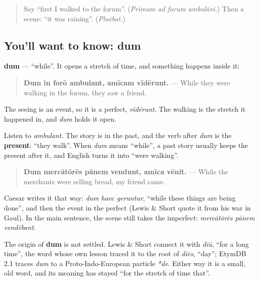 \label{lesson:LA-C282-dum}



\begin{quote}
Say \textquotedblleft{}first I walked to the forum\textquotedblright{}. (\emph{Prīmum ad forum ambulāvī.}) Then a scene: \textquotedblleft{}it was raining\textquotedblright{}. (\emph{Pluēbat.})
\end{quote}

\subsection*{You'll want to know: dum}
\textbf{dum} — \textquotedblleft{}while\textquotedblright{}. It opens a stretch of time, and something happens inside it:

\begin{quote}
\textbf{Dum in forō ambulant, amīcam vīdērunt.} — While they were walking in the forum, they saw a friend.
\end{quote}

The seeing is an event, so it is a perfect, \emph{vīdērunt}. The walking is the stretch it happened in, and \emph{dum} holds it open.

\begin{grammarlens}[title={Grammar Lens: dum keeps the present}]
Listen to \emph{ambulant}. The story is in the past, and the verb after \emph{dum} is the \textbf{present}: \textquotedblleft{}they walk\textquotedblright{}. When \emph{dum} means \textquotedblleft{}while\textquotedblright{}, a past story usually keeps the present after it, and English turns it into \textquotedblleft{}were walking\textquotedblright{}.

\begin{quote}
\textbf{Dum mercātōrēs pānem vendunt, amīca vēnit.} — While the merchants were selling bread, my friend came.
\end{quote}

Caesar writes it that way: \emph{dum haec geruntur}, \textquotedblleft{}while these things are being done\textquotedblright{}, and then the event in the perfect (Lewis \& Short quote it from his war in Gaul). In the main sentence, the scene still takes the imperfect: \emph{mercātōrēs pānem vendēbant}.
\end{grammarlens}

\begin{cousinweb}
The origin of \textbf{dum} is not settled. Lewis \& Short connect it with \emph{diū}, \textquotedblleft{}for a long time\textquotedblright{}, the word whose own lesson traced it to the root of \emph{diēs}, \textquotedblleft{}day\textquotedblright{}; EtymDB 2.1 traces \emph{dum} to a Proto-Indo-European particle \emph{*de}. Either way it is a small, old word, and its meaning has stayed \textquotedblleft{}for the stretch of time that\textquotedblright{}.
\end{cousinweb}


